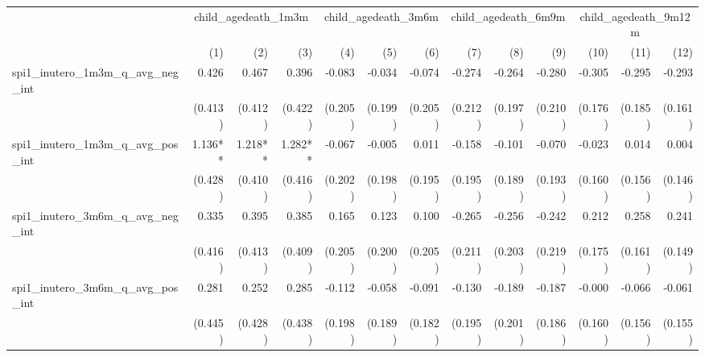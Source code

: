 \begin{tabular}{lrrrrrrrrrrrr}
\toprule
                                            &  \multicolumn{3}{c}{child\_agedeath\_1m3m} &  \multicolumn{3}{c}{child\_agedeath\_3m6m} &  \multicolumn{3}{c}{child\_agedeath\_6m9m} & \multicolumn{3}{c}{child\_agedeath\_9m12m} \\ 
\cmidrule(lr){2-4} \cmidrule(lr){5-7} \cmidrule(lr){8-10} \cmidrule(lr){11-13} 
                                            &          (1) &          (2) &          (3) &          (4) &          (5) &          (6) &          (7) &          (8) &          (9) &         (10) &         (11) &         (12) \\ 
\midrule
spi1\_inutero\_1m3m\_q\_avg\_neg\_int       &        0.426 &        0.467 &        0.396 &       -0.083 &       -0.034 &       -0.074 &       -0.274 &       -0.264 &       -0.280 &       -0.305 &       -0.295 &       -0.293 \\ 
                                            &      (0.413) &      (0.412) &      (0.422) &      (0.205) &      (0.199) &      (0.205) &      (0.212) &      (0.197) &      (0.210) &      (0.176) &      (0.185) &      (0.161) \\ 
spi1\_inutero\_1m3m\_q\_avg\_pos\_int       &      1.136** &      1.218** &      1.282** &       -0.067 &       -0.005 &        0.011 &       -0.158 &       -0.101 &       -0.070 &       -0.023 &        0.014 &        0.004 \\ 
                                            &      (0.428) &      (0.410) &      (0.416) &      (0.202) &      (0.198) &      (0.195) &      (0.195) &      (0.189) &      (0.193) &      (0.160) &      (0.156) &      (0.146) \\ 
spi1\_inutero\_3m6m\_q\_avg\_neg\_int       &        0.335 &        0.395 &        0.385 &        0.165 &        0.123 &        0.100 &       -0.265 &       -0.256 &       -0.242 &        0.212 &        0.258 &        0.241 \\ 
                                            &      (0.416) &      (0.413) &      (0.409) &      (0.205) &      (0.200) &      (0.205) &      (0.211) &      (0.203) &      (0.219) &      (0.175) &      (0.161) &      (0.149) \\ 
spi1\_inutero\_3m6m\_q\_avg\_pos\_int       &        0.281 &        0.252 &        0.285 &       -0.112 &       -0.058 &       -0.091 &       -0.130 &       -0.189 &       -0.187 &       -0.000 &       -0.066 &       -0.061 \\ 
                                            &      (0.445) &      (0.428) &      (0.438) &      (0.198) &      (0.189) &      (0.182) &      (0.195) &      (0.201) &      (0.186) &      (0.160) &      (0.156) &      (0.155) \\ 

\end{tabular}
